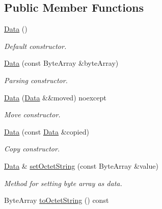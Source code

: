\subsection*{Public Member Functions}
\begin{DoxyCompactItemize}
\item 
\mbox{\label{classDiameter_1_1AVP_1_1Data_a37f612363f90b54dafc6fff7f21104f0}} 
\hyperlink{classDiameter_1_1AVP_1_1Data_a37f612363f90b54dafc6fff7f21104f0}{Data} ()
\begin{DoxyCompactList}\small\item\em Default constructor. \end{DoxyCompactList}\item 
\hyperlink{classDiameter_1_1AVP_1_1Data_a204b2752879567b7db58d0b1f567152d}{Data} (const Byte\+Array \&byte\+Array)
\begin{DoxyCompactList}\small\item\em Parsing constructor. \end{DoxyCompactList}\item 
\mbox{\label{classDiameter_1_1AVP_1_1Data_ab0eb2092eb046830e80053caa2840f2e}} 
\hyperlink{classDiameter_1_1AVP_1_1Data_ab0eb2092eb046830e80053caa2840f2e}{Data} (\hyperlink{classDiameter_1_1AVP_1_1Data}{Data} \&\&moved) noexcept
\begin{DoxyCompactList}\small\item\em Move constructor. \end{DoxyCompactList}\item 
\hyperlink{classDiameter_1_1AVP_1_1Data_ad1c46848ad1714db421bdd4835e5dbc7}{Data} (const \hyperlink{classDiameter_1_1AVP_1_1Data}{Data} \&copied)
\begin{DoxyCompactList}\small\item\em Copy constructor. \end{DoxyCompactList}\item 
\hyperlink{classDiameter_1_1AVP_1_1Data}{Data} \& \hyperlink{classDiameter_1_1AVP_1_1Data_a12bbc6bbced56e8151e34e7b49963963}{set\+Octet\+String} (const Byte\+Array \&value)
\begin{DoxyCompactList}\small\item\em Method for setting byte array as data. \end{DoxyCompactList}\item 
Byte\+Array \hyperlink{classDiameter_1_1AVP_1_1Data_aa344738719504128278ccdecd2baea77}{to\+Octet\+String} () const

\end{DoxyCompactItemize}
